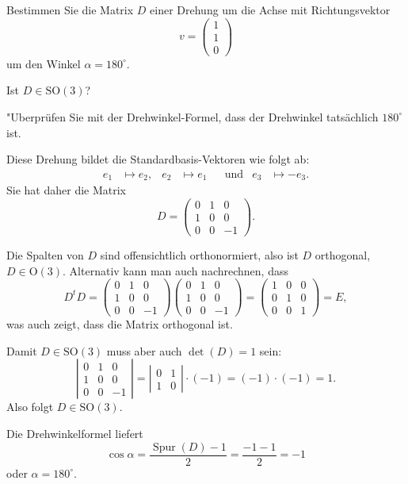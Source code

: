 Bestimmen Sie die Matrix $D$ einer Drehung um die Achse mit Richtungsvektor
\[
v=\begin{pmatrix}1\\1\\0\end{pmatrix}
\]
um den Winkel $\alpha=180^\circ$.
\begin{teilaufgaben}
\item Ist $D\in\text{SO}(3)$?
\item "Uberprüfen Sie mit der Drehwinkel-Formel, dass der Drehwinkel
tatsächlich $180^\circ$ ist.
\end{teilaufgaben}

\begin{loesung}
Diese Drehung bildet die Standardbasis-Vektoren wie folgt ab:
\[
\begin{aligned}
e_1&\mapsto e_2,
&
e_2&\mapsto e_1
&&\text{und}
&
e_3&\mapsto -e_3.
\end{aligned}
\]
Sie hat daher die Matrix
\[
D
=
\begin{pmatrix}
0&1& 0\\
1&0& 0\\
0&0&-1
\end{pmatrix}.
\]
\begin{teilaufgaben}
\item Die Spalten von $D$ sind offensichtlich orthonormiert, also ist $D$
orthogonal, $D\in\textrm{O}(3)$.
Alternativ kann man auch nachrechnen, dass
\[
D^tD
=
\begin{pmatrix}
0&1& 0\\
1&0& 0\\
0&0&-1
\end{pmatrix}
\begin{pmatrix}
0&1& 0\\
1&0& 0\\
0&0&-1
\end{pmatrix}
=
\begin{pmatrix}
1&0&0\\
0&1&0\\
0&0&1
\end{pmatrix}
=E,
\]
was auch zeigt, dass die Matrix orthogonal ist.

Damit $D\in\textrm{SO}(3)$ muss aber auch $\det(D)=1$ sein:
\[
\left|
\begin{matrix}
0&1& 0\\
1&0& 0\\
0&0&-1
\end{matrix}\right|
=
\left|\begin{matrix}0&1\\1&0\end{matrix}\right|\cdot (-1)
=(-1)\cdot(-1)=1.
\]
Also folgt $D\in\textrm{SO}(3)$.
\item
Die Drehwinkelformel liefert
\[
\cos\alpha = \frac{\operatorname{Spur}(D)-1}2=\frac{-1-1}2=-1
\]
oder $\alpha=180^\circ$.
\qedhere
\end{teilaufgaben}
\end{loesung}

